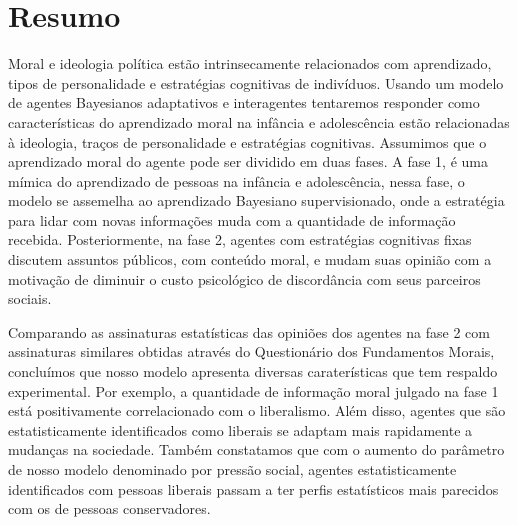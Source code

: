 \chapter*{Resumo}

Moral e ideologia política estão intrinsecamente relacionados
com aprendizado, tipos de personalidade e estratégias cognitivas de
indivíduos. Usando um modelo de agentes Bayesianos adaptativos e interagentes
tentaremos responder como características do aprendizado moral na infância
e adolescência estão relacionadas à ideologia, traços de personalidade e
estratégias cognitivas. Assumimos que o aprendizado moral do agente pode ser
dividido em duas fases. A fase 1, é uma mímica do aprendizado de pessoas na
infância e adolescência, nessa fase, o modelo se assemelha ao aprendizado
Bayesiano supervisionado, onde a estratégia para lidar com novas informações
muda com a quantidade de informação recebida.  Posteriormente, na fase 2,
agentes com estratégias cognitivas fixas discutem assuntos públicos, com
conteúdo moral, e mudam suas opinião com a motivação de diminuir o custo
psicológico de discordância com seus parceiros sociais.

Comparando as assinaturas estatísticas das opiniões dos agentes na fase 2
com assinaturas similares obtidas através do Questionário dos Fundamentos
Morais, concluímos que nosso modelo apresenta diversas caraterísticas que tem
respaldo experimental. Por exemplo, a quantidade de informação moral julgado
na fase 1 está positivamente correlacionado com o liberalismo. Além disso,
agentes que são estatisticamente identificados como liberais se adaptam
mais rapidamente a mudanças na sociedade. Também constatamos que com o
aumento do parâmetro de nosso modelo denominado por pressão social, agentes
estatisticamente identificados com pessoas liberais passam a ter perfis
estatísticos mais parecidos com os de pessoas conservadores.
